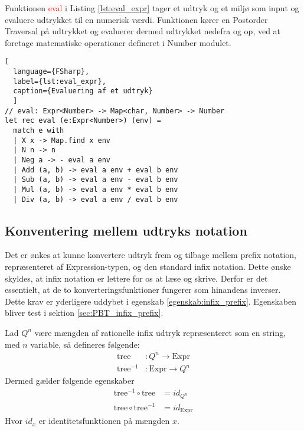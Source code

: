 Funktionen \textcolor{red}{eval} i Listing \ref{lst:eval_expr} tager et udtryk og et miljø som input og evaluere udtrykket til en numerisk værdi. Funktionen kører en Postorder Traversal på udtrykket og evaluerer dermed udtrykket nedefra og op, ved at foretage matematiske operationer defineret i Number modulet. 

\begin{lstlisting}[
  language={FSharp}, 
  label={lst:eval_expr}, 
  caption={Evaluering af et udtryk}
  ]
// eval: Expr<Number> -> Map<char, Number> -> Number
let rec eval (e:Expr<Number>) (env) =
  match e with
  | X x -> Map.find x env
  | N n -> n
  | Neg a -> - eval a env
  | Add (a, b) -> eval a env + eval b env
  | Sub (a, b) -> eval a env - eval b env
  | Mul (a, b) -> eval a env * eval b env
  | Div (a, b) -> eval a env / eval b env
\end{lstlisting}

\subsection{Konventering mellem udtryks notation}\label{sec:expression_generation}
Det er ønkes at kunne konvertere udtryk frem og tilbage mellem prefix notation, repræsenteret af Expression-typen, og den standard infix notation. Dette ønske skyldes, at infix notation er lettere for os at læse og skrive. Derfor er det essentielt, at de to konverteringsfunktioner fungerer som hinandens inverser. Dette krav er yderligere uddybet i egenskab \ref{egenskab:infix_prefix}. Egenskaben bliver test i sektion \ref{sec:PBT_infix_prefix}.

\vspace{0.5cm}
\begin{egenskab}\label{egenskab:infix_prefix}
    Lad $Q^n$ være mængden af rationelle infix udtryk repræsenteret som en string, med $n$ variable, så defineres følgende:
    \begin{align*}
      \text{tree}&: Q^n \to \text{Expr} \\
      \text{tree}^{-1}&: \text{Expr} \to  Q^n  
    \end{align*}
    Dermed gælder følgende egenskaber
    \begin{align*}
      \text{tree}^{-1} \circ \text{tree} &= id_{Q^n} \\
      \text{tree} \circ \text{tree}^{-1} &= id_{\text{Expr}}
    \end{align*}
    Hvor $id_{x}$ er identitetsfunktionen på mængden $x$.
\end{egenskab}

